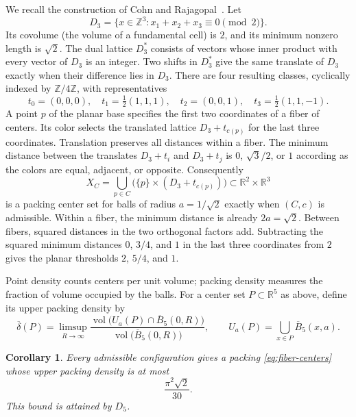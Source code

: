 \documentclass[11pt,a4paper]{article}
\newtheorem{corollary}[theorem]{Corollary}
\theoremstyle{definition}
\theoremstyle{remark}
\newcommand{\R}{\mathbb{R}}
\newcommand{\Z}{\mathbb{Z}}
\DeclareMathOperator{\vol}{vol}
\begin{document}
We recall the construction of Cohn and Rajagopal~\cite[Section~4.1]{CR}.
Let
\[
D_3=\{x\in\Z^3:x_1+x_2+x_3\equiv0\pmod2\}.
\]
Its covolume (the volume of a fundamental cell) is $2$, and its minimum
nonzero length is $\sqrt2$. The dual lattice $D_3^*$ consists of vectors
whose inner product with every vector of $D_3$ is an integer. Two shifts
in $D_3^*$ give the same translate of $D_3$ exactly when their difference
lies in $D_3$. There are four resulting classes, cyclically indexed by
$\Z/4\Z$, with representatives
\begin{equation}
\label{eq:coset-representatives}
t_0=(0,0,0),\quad
t_1=\tfrac12(1,1,1),\quad
t_2=(0,0,1),\quad
t_3=\tfrac12(1,1,-1).
\end{equation}
A point $p$ of the planar base specifies the first two coordinates of
a fiber of centers. Its color selects the translated lattice
$D_3+t_{c(p)}$ for the last three coordinates. Translation preserves all
distances within a fiber. The minimum distance between the translates
$D_3+t_i$ and $D_3+t_j$ is $0$, $\sqrt3/2$, or $1$ according as the
colors are equal, adjacent, or opposite. Consequently
\begin{equation}
\label{eq:fiber-centers}
X_C=\bigcup_{p\in C}\bigl(\{p\}\times(D_3+t_{c(p)})\bigr)
\subset\R^2\times\R^3
\end{equation}
is a packing center set for balls of radius $a=1/\sqrt2$ exactly when
$(C,c)$ is admissible. Within a fiber, the minimum distance is already
$2a=\sqrt2$. Between fibers, squared distances in the two orthogonal
factors add. Subtracting the squared minimum distances $0$, $3/4$, and
$1$ in the last three coordinates from $2$ gives the planar thresholds
$2$, $5/4$, and $1$.

Point density counts centers per unit volume; packing density measures
the fraction of volume occupied by the balls. For a center set
$P\subset\R^5$ as above, define its upper packing density by
\[
\overline\delta(P)=
\limsup_{R\to\infty}
\frac{\vol\bigl(U_a(P)\cap\overline B_5(0,R)\bigr)}
     {\vol\bigl(\overline B_5(0,R)\bigr)},
\qquad
U_a(P)=\bigcup_{x\in P}\overline B_5(x,a).
\]

\begin{corollary}
\label{cor:fiber-density}
Every admissible configuration gives a packing \eqref{eq:fiber-centers}
whose upper packing density is at most
\begin{equation}
\label{eq:d5-density}
\frac{\pi^2\sqrt2}{30}.
\end{equation}
This bound is attained by $D_5$.
\end{corollary}
\end{document}
